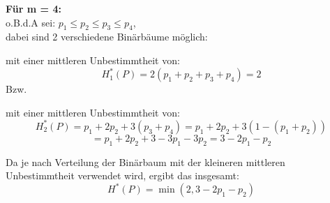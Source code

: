 \begin{uebsp}
\begin{Answer}
\textbf{Für m = 4:}\\
o.B.d.A sei: 
$p_1 \le p_2 \le p_3 \le p_4$, \\
dabei sind 2 verschiedene Binärbäume möglich:
\begin{center}
\end{center}
mit einer mittleren Unbestimmtheit von:
\[H_1^*(P) = 2(p_1 + p_2 + p_3 + p_4) = 2\]
Bzw.
\begin{center}
\end{center}
mit einer mittleren Unbestimmtheit von:
\[H_2^*(P) = p_1 + 2 p_2 + 3 (p_3 + p_4) = p_1 + 2 p_2 + 3(1- (p_1 + p_2))\]
\[= p_1 + 2 p_2 + 3 - 3 p_1 - 3 p_2 = 3 - 2 p_1 - p_2\]

Da je nach Verteilung der Binärbaum mit der kleineren mittleren Unbestimmtheit verwendet wird, ergibt das insgesamt:
\[H^*(P) = \min(2, 3 - 2 p_1 - p_2)\]
\end{Answer}
\end{uebsp}
